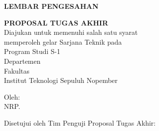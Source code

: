 \begin{center}
  \large
  \textbf{LEMBAR PENGESAHAN}
\end{center}

\thispagestyle{empty}

\begin{center}
  \textbf{\tatitle{}}
\end{center}

\begingroup
\small

\begin{center}
  \textbf{PROPOSAL TUGAS AKHIR}
  \\Diajukan untuk memenuhi salah satu syarat \\
  memperoleh gelar Sarjana Teknik pada \\
  Program Studi S-1 \studyprogram{} \\
  Departemen \department{} \\
  Fakultas \faculty{} \\
  Institut Teknologi Sepuluh Nopember
\end{center}

\begin{center}
  Oleh: \textbf{\name{}}
  \\NRP. \nrp{}
\end{center}

\begin{center}
  Disetujui oleh Tim Penguji Proposal Tugas Akhir:
\end{center}

\begingroup
\setlength{\tabcolsep}{0pt}

